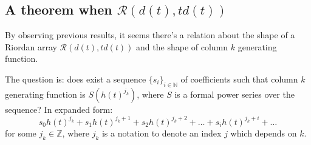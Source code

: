 \documentclass[11pt,a4paper]{article} %
\begin{document}
    \subsection{A theorem when $\mathcal{R}(d(t), td(t))$}

    By observing previous results, it seems there's a relation
    about the shape of a Riordan array $\mathcal{R}(d(t), td(t))$ 
    and the shape of column $k$ generating function. 
    
    The question is: does exist a sequence $\lbrace s_i \rbrace_{i \in \mathbb{N}}$ 
    of coefficients such that column $k$ generating function is $S(h(t)^{j_k})$, where $S$
    is a formal power series over the sequence? In expanded form: 
    \begin{displaymath}
        s_0h(t)^{j_k} + s_1 h(t)^{j_k+1} + s_2 h(t)^{j_k+2} + \ldots + s_i h(t)^{j_k+i} + \ldots
    \end{displaymath}
    for some $j_k \in \mathbb{Z}$, where $j_k$ is a notation to denote an index $j$ 
    which depends on $k$.
\end{document}
